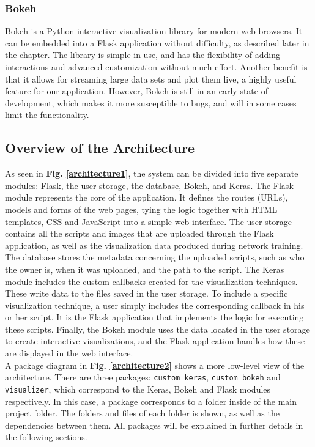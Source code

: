 \subsubsection{Bokeh}

Bokeh is a Python interactive visualization library for modern web browsers. It can be embedded into a Flask application without difficulty, as described later in the chapter. The library is simple in use, and has the flexibility of adding interactions and advanced customization without much effort. Another benefit is that it allows for streaming large data sets and plot them live, a highly useful feature for our application. However, Bokeh is still in an early state of development, which makes it more susceptible to bugs, and will in some cases limit the functionality.

\subsection{Overview of the Architecture}

As seen in \textbf{Fig. \ref{architecture1}}, the system can be divided into five separate modules: Flask, the user storage, the database, Bokeh, and Keras. The Flask module represents the core of the application. It defines the routes (URLs), models and forms of the web pages, tying the logic together with HTML templates, CSS and JavaScript into a simple web interface. The user storage contains all the scripts and images that are uploaded through the Flask application, as well as the visualization data produced during network training. The database stores the metadata concerning the uploaded scripts, such as who the owner is, when it was uploaded, and the path to the script. The Keras module includes the custom callbacks created for the visualization techniques. These write data to the files saved in the user storage. To include a specific visualization technique, a user simply includes the corresponding callback in his or her script. It is the Flask application that implements the logic for executing these scripts. Finally, the Bokeh module uses the data located in the user storage to create interactive visualizations, and the Flask application handles how these are displayed in the web interface. \\

\noindent A package diagram in \textbf{Fig. \ref{architecture2}} shows a more low-level view of the architecture. There are three packages: \texttt{custom\_keras}, \texttt{custom\_bokeh} and \texttt{visualizer}, which correspond to the Keras, Bokeh and Flask modules respectively. In this case, a package corresponds to a folder inside of the main project folder. The folders and files of each folder is shown, as well as the dependencies between them. All packages will be explained in further details in the following sections.

